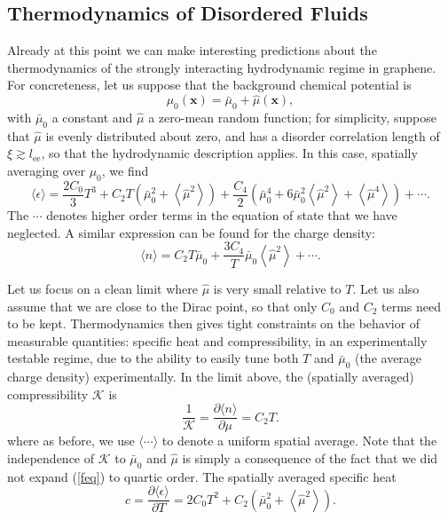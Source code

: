 \documentclass[10pt, oneside]{book}
\begin{document}
\begin{doublespace}
\begin{appendix}

\subsection{Thermodynamics of Disordered Fluids}
Already at this point we can make interesting predictions about the thermodynamics of the strongly interacting hydrodynamic regime in graphene.   For concreteness, let us suppose that the background chemical potential is \begin{equation}
\mu_0(\mathbf{x}) = \bar\mu_0 + \hat\mu(\mathbf{x}),
\end{equation}
with $\bar\mu_0$ a constant and $\hat\mu$ a zero-mean random function;  for simplicity, suppose that $\hat\mu$ is evenly distributed about zero, and has a disorder correlation length of $\xi\gtrsim l_{\mathrm{ee}}$, so that the hydrodynamic description applies.   In this case, spatially averaging over $\mu_0$, we find \begin{equation}
\langle \epsilon\rangle = \frac{2C_0}{3}T^3  + C_2T\left(\bar\mu_0^2+\left\langle \hat\mu^2\right\rangle \right) + \frac{C_4}{2}\left(\bar\mu_0^4 + 6\bar\mu_0^2\left\langle \hat\mu^2\right\rangle + \left\langle \hat\mu^4\right\rangle\right) + \cdots.
\end{equation}
The $\cdots$ denotes higher order terms in the equation of state that we have neglected.  A similar expression can be found for the charge density: \begin{equation}
\langle n\rangle = C_2 T \bar\mu_0 + \frac{3C_4}{T}\bar\mu_0 \left\langle \hat\mu^2\right\rangle + \cdots.
\end{equation}

Let us focus on a clean limit where $\hat\mu$ is very small relative to $T$.    Let us also assume that we are close to the Dirac point, so that only $C_0$ and $C_2$ terms need to be kept.   Thermodynamics then gives tight constraints on the behavior of measurable quantities: specific heat and compressibility,  in an experimentally testable regime, due to the ability to easily tune both $T$ and $\bar\mu_0$ (the average charge density) experimentally.  In the limit above, the (spatially averaged) compressibility $\mathcal{K}$ is \begin{equation}
\frac{1}{\mathcal{K}} = \frac{\partial \langle n\rangle}{\partial \mu}  = C_2T.
\end{equation}
where as before, we use $\langle\cdots\rangle$ to denote a uniform spatial average.    Note that the independence of $\mathcal{K}$ to $\bar\mu_0$ and $\hat\mu$ is simply a consequence of the fact that we did not expand (\ref{feq}) to quartic order.  The spatially averaged specific heat \begin{equation}
 c = \frac{\partial \langle \epsilon\rangle}{\partial T} = 2C_0T^2 + C_2\left(\bar\mu_0^2+\left\langle \hat\mu^2\right\rangle\right).
\end{equation}


\end{appendix}
\end{doublespace}
\end{document}
